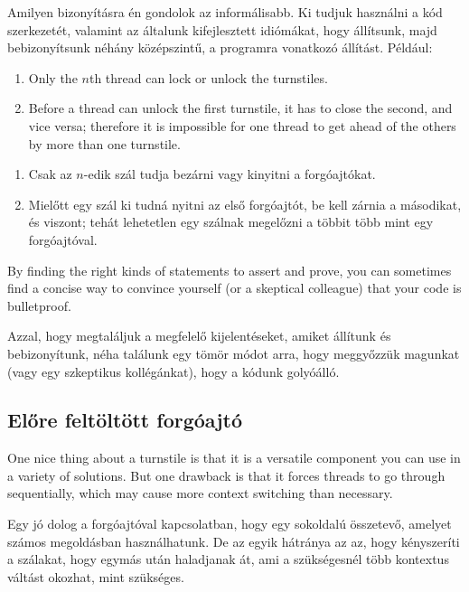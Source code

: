 \documentclass{book}
\newcommand{\clearemptydoublepage}{\newpage\cleardoublepage}
\begin{document}
Amilyen bizonyításra én gondolok az informálisabb. Ki tudjuk használni a kód
szerkezetét, valamint az általunk kifejlesztett idiómákat, hogy állítsunk,
majd bebizonyítsunk néhány középszintű, a programra vonatkozó állítást.
Például:

\begin{enumerate}

\item Only the $n$th thread can lock or unlock the turnstiles.

\item Before a thread can unlock the first turnstile, it has to close 
the second, and vice versa; therefore it is impossible for one thread
to get ahead of the others by more than one turnstile.

\end{enumerate}

\begin{enumerate}

\item Csak az $n$-edik szál tudja bezárni vagy kinyitni a forgóajtókat.

\item Mielőtt egy szál ki tudná nyitni az első forgóajtót, be kell zárnia
a másodikat, és viszont; tehát lehetetlen
egy szálnak megelőzni a többit több mint egy forgóajtóval.

\end{enumerate}

By finding the right kinds of statements to assert and
prove, you can sometimes find a concise way to convince yourself
(or a skeptical colleague) that your code is bulletproof.

Azzal, hogy megtaláljuk a megfelelő kijelentéseket, amiket állítunk és
bebizonyítunk, néha találunk egy tömör módot arra, hogy meggyőzzük magunkat
(vagy egy szkeptikus kollégánkat), hogy a kódunk golyóálló.


\clearemptydoublepage
\subsection{Előre feltöltött forgóajtó}

One nice thing about a turnstile is that it is a versatile
component you can use in a variety of solutions.  But one
drawback is that it forces threads to go through sequentially,
which may cause more context switching than necessary.

Egy jó dolog a forgóajtóval kapcsolatban, hogy egy sokoldalú összetevő,
amelyet számos megoldásban használhatunk. De az egyik hátránya az az,
hogy kényszeríti a szálakat, hogy egymás után haladjanak át, ami a
szükségesnél több kontextus váltást okozhat, mint szükséges.
\end{document}
